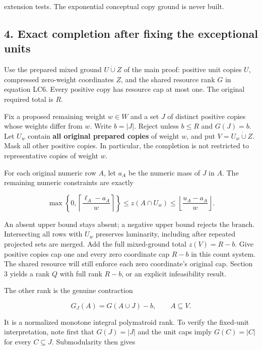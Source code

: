 extension tests. The exponential conceptual copy ground is never built.

\hypertarget{af-fe230a140d-exact-completion-after-fixing-the-exceptional-units}{%
\subsection{4. Exact completion after fixing the exceptional units}\label{af-fe230a140d-exact-completion-after-fixing-the-exceptional-units}}

Use the prepared mixed ground \(U\dot\cup Z\) of the main proof: positive unit copies \(U\), compressed zero-weight coordinates \(Z\), and the shared resource rank \(G\) in equation LC6. Every positive copy has resource cap at most one. The original required total is \(R\).

Fix a proposed remaining weight \(w\in W\) and a set \(J\) of distinct positive copies whose weights differ from \(w\). Write \(b=|J|\). Reject unless \(b\le R\) and \(G(J)=b\). Let \(U_w\) contain \textbf{all original prepared copies} of weight \(w\), and put \(V=U_w\dot\cup Z\). Mask all other positive copies. In particular, the completion is not restricted to representative copies of weight \(w\).

For each original numeric row \(A\), let \(a_A\) be the numeric mass of \(J\) in \(A\). The remaining numeric constraints are exactly

\[
\max\!\left\{0,\left\lceil\frac{\ell_A-a_A}{w}\right\rceil\right\}
\le z(A\cap U_w)
\le \left\lfloor\frac{u_A-a_A}{w}\right\rfloor.
\tag{DW11}
\]

An absent upper bound stays absent; a negative upper bound rejects the branch. Intersecting all rows with \(U_w\) preserves laminarity, including after repeated projected sets are merged. Add the full mixed-ground total \(z(V)=R-b\). Give positive copies cap one and every zero coordinate cap \(R-b\) in this count system. The shared resource will still enforce each zero coordinate's original cap. Section 3 yields a rank \(Q\) with full rank \(R-b\), or an explicit infeasibility result.

The other rank is the genuine contraction

\[
G_J(A)=G(A\cup J)-b,
\qquad A\subseteq V.
\tag{DW12}
\]

It is a normalized monotone integral polymatroid rank. To verify the fixed-unit interpretation, note first that \(G(J)=|J|\) and the unit caps imply \(G(C)=|C|\) for every \(C\subseteq J\). Submodularity then gives

